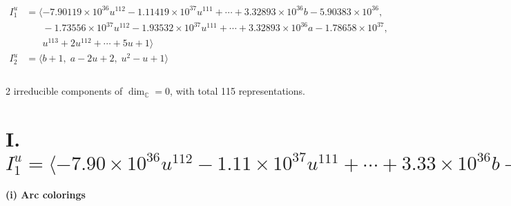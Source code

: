 \documentclass[1p]{elsarticle_modified}
\theoremstyle{definition}
\begin{document}
\begin{align*}
I^u_{1}&=\langle 
-7.90119\times10^{36} u^{112}-1.11419\times10^{37} u^{111}+\cdots+3.32893\times10^{36} b-5.90383\times10^{36},\\
\phantom{I^u_{1}}&\phantom{= \langle  }-1.73556\times10^{37} u^{112}-1.93532\times10^{37} u^{111}+\cdots+3.32893\times10^{36} a-1.78658\times10^{37},\\
\phantom{I^u_{1}}&\phantom{= \langle  }u^{113}+2 u^{112}+\cdots+5 u+1\rangle \\
I^u_{2}&=\langle 
b+1,\;a-2 u+2,\;u^2- u+1\rangle \\
\\
\end{align*}
\raggedright * 2 irreducible components of $\dim_{\mathbb{C}}=0$, with total 115 representations.\\
\newpage
\renewcommand{\arraystretch}{1}
\centering \section*{I. $I^u_{1}= \langle -7.90\times10^{36} u^{112}-1.11\times10^{37} u^{111}+\cdots+3.33\times10^{36} b-5.90\times10^{36},\;-1.74\times10^{37} u^{112}-1.94\times10^{37} u^{111}+\cdots+3.33\times10^{36} a-1.79\times10^{37},\;u^{113}+2 u^{112}+\cdots+5 u+1 \rangle$}
\flushleft \textbf{(i) Arc colorings}\\
\end{document}
